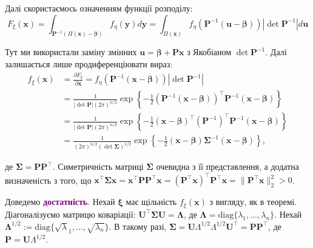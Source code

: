 \documentclass{../hw_template}
\begin{document}
Далі скористаємось означенням функції розподілу:
\begin{equation*}
    F_{\xi}(\mathbf{x}) = \int_{\boldsymbol{P}^{-1}(\Pi(\mathbf{x})-\boldsymbol{\beta})}f_{\eta}(\mathbf{y})d\mathbf{y} = \int_{\Pi(\mathbf{x})} f_{\eta}\left(\boldsymbol{P}^{-1}(\mathbf{u} - \boldsymbol{\beta})\right)|\det \boldsymbol{P}^{-1}| d\mathbf{u}
\end{equation*}

Тут ми використали заміну змінних $\mathbf{u} = \boldsymbol{\beta} + \boldsymbol{P}\mathbf{x}$ з Якобіаном $\det \boldsymbol{P}^{-1}$. Далі залишається лише продиференціювати вираз:
\begin{align*}
    f_{\xi}(\mathbf{x}) &= \frac{\partial F_{\xi}}{\partial \mathbf{x}} = f_{\eta}(\boldsymbol{P}^{-1}(\mathbf{x} - \boldsymbol{\beta}))|\det \boldsymbol{P}^{-1}|
    \\
    &= \frac{1}{|\det \boldsymbol{P}|(2\pi)^{n/2}}\exp\left\{-\frac{1}{2}(\boldsymbol{P}^{-1}(\mathbf{x}-\boldsymbol{\beta}))^{\top}\boldsymbol{P}^{-1}(\mathbf{x}-\boldsymbol{\beta})\right\} \\
    &= \frac{1}{|\det \boldsymbol{P}|(2\pi)^{n/2}}\exp\left\{-\frac{1}{2}(\mathbf{x}-\boldsymbol{\beta})^{\top}(\boldsymbol{P}^{-1})^{\top}\boldsymbol{P}^{-1}(\mathbf{x}-\boldsymbol{\beta})\right\} \\
    &= \frac{1}{(2\pi)^{n/2}(\det \boldsymbol{\Sigma})^{1/2}}\exp\left\{-\frac{1}{2}(\mathbf{x}-\boldsymbol{\beta})\boldsymbol{\Sigma}^{-1}(\mathbf{x}-\boldsymbol{\beta})\right\},
\end{align*}

де $\boldsymbol{\Sigma} = \boldsymbol{PP}^{\top}$. Симетричність матриці $\boldsymbol{\Sigma}$ очевидна з її 
представлення, а додатна визначеність з того, що $\mathbf{x}^{\top}\boldsymbol{\Sigma}\mathbf{x} = \mathbf{x}^{\top}\boldsymbol{PP}^{\top}\mathbf{x} = (\boldsymbol{P}^{\top}\mathbf{x})^{\top}\boldsymbol{P}^{\top}\mathbf{x} = \|\boldsymbol{P}^{\top}\mathbf{x}\|^2_2 > 0$. 

Доведемо \textcolor{purple}{\textbf{достатність}}. Нехай $\boldsymbol{\xi}$ має щільність $f_{\xi}(\mathbf{x})$ з вигляду, як в теоремі. 
Діагоналізуємо матрицю коваріації: $\boldsymbol{U}^{\top}\boldsymbol{\Sigma}\boldsymbol{U} = \boldsymbol{\Lambda}$, де 
$\boldsymbol{\Lambda} = \text{diag}\{\lambda_1,\dots,\lambda_n\}$. Нехай $\boldsymbol{\Lambda}^{1/2} := \text{diag}\{\sqrt{\lambda}_1,\dots,\sqrt{\lambda_n}\}$. В такому разі, $\boldsymbol{\Sigma} = \boldsymbol{U}\Lambda^{1/2}\Lambda^{1/2}\boldsymbol{U}^{\top} = \boldsymbol{P}\boldsymbol{P}^{\top}$, де $\boldsymbol{P} = \boldsymbol{U}\Lambda^{1/2}$.
\end{document}
